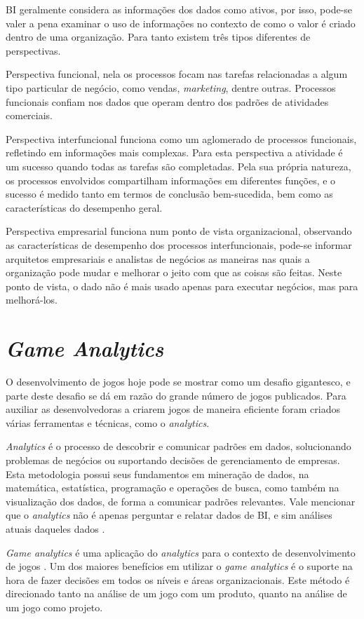 BI geralmente considera as informações dos dados como ativos, por isso, pode-se valer a pena examinar o uso de informações no contexto de como o valor é criado dentro de uma organização. Para tanto existem três tipos diferentes de perspectivas.

Perspectiva funcional, nela os processos focam nas tarefas relacionadas a algum tipo particular de negócio, como vendas, \textit{marketing}, dentre outras. Processos funcionais confiam nos dados que operam dentro dos padrões de atividades comerciais.

Perspectiva interfuncional funciona como um aglomerado de processos funcionais, refletindo em informações mais complexas. Para esta perspectiva a atividade é um sucesso quando todas as tarefas são completadas. Pela sua própria natureza, os processos envolvidos compartilham informações em diferentes funções, e o sucesso é medido tanto em termos de conclusão bem-sucedida, bem como as características do desempenho geral.

Perspectiva empresarial funciona num ponto de vista organizacional, observando as características de desempenho dos processos interfuncionais, pode-se informar arquitetos empresariais e analistas de negócios as maneiras nas quais a organização pode mudar e melhorar o jeito com que as coisas são feitas. Neste ponto de vista, o dado não é mais usado apenas para executar negócios, mas para melhorá-los.

\section{\textit{Game Analytics}}
O desenvolvimento de jogos hoje pode se mostrar como um desafio gigantesco, e parte deste desafio se dá em razão do grande número de jogos publicados. Para auxiliar as desenvolvedoras a criarem jogos de maneira eficiente foram criados várias ferramentas e técnicas, como o \textit{analytics}.

\textit{Analytics} é o processo de descobrir e comunicar padrões em dados, solucionando problemas de negócios ou suportando decisões de gerenciamento de empresas. Esta metodologia possui seus fundamentos em mineração de dados, na matemática, estatística, programação e operações de busca, como também na visualização dos dados, de forma a comunicar padrões relevantes. Vale mencionar que o \textit{analytics} não é apenas perguntar e relatar dados de BI, e sim análises atuais daqueles dados \cite{analytics}. 

\textit{Game analytics} é uma aplicação do \textit{analytics} para o contexto de desenvolvimento de jogos \cite{game_analytics}. Um dos maiores benefícios em utilizar o \textit{game analytics} é o suporte na hora de fazer decisões em todos os níveis e áreas organizacionais. Este método é direcionado tanto na análise de um jogo com um produto, quanto na análise de um jogo como projeto.


